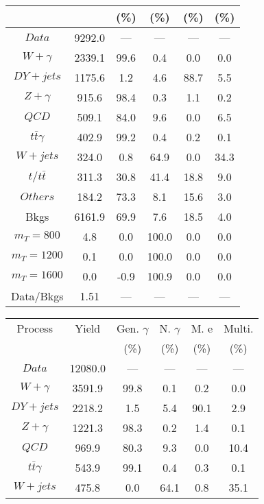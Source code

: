 \begin{figure}
\begin{minipage}[c]{0.32\textwidth}
{\begin{tabular}{cccccc}
 &  & (\%) & (\%) & (\%) & (\%)  \\
\hline
                                                                      $ Data $ &  9292.0 &  --- &  --- &  --- &  ---\\
$ W+\gamma $ &  2339.1 &  99.6 &  0.4 &  0.0 &  0.0\\
$ DY+jets $ &  1175.6 &  1.2 &  4.6 &  88.7 &  5.5\\
$ Z+\gamma $ &  915.6 &  98.4 &  0.3 &  1.1 &  0.2\\
$ QCD $ &  509.1 &  84.0 &  9.6 &  0.0 &  6.5\\
$ t\bar{t}\gamma $ &  402.9 &  99.2 &  0.4 &  0.2 &  0.1\\
$ W+jets $ &  324.0 &  0.8 &  64.9 &  0.0 &  34.3\\
$ t/t\bar{t} $ &  311.3 &  30.8 &  41.4 &  18.8 &  9.0\\
$ Others $ &  184.2 &  73.3 &  8.1 &  15.6 &  3.0\\
Bkgs &  6161.9 &  69.9 &  7.6 &  18.5 &  4.0\\
$ m_{T} = 800 $ &  4.8 &  0.0 &  100.0 &  0.0 &  0.0\\
$ m_{T} = 1200 $ &  0.1 &  0.0 &  100.0 &  0.0 &  0.0\\
$ m_{T} = 1600 $ &  0.0 &  -0.9 &  100.9 &  0.0 &  0.0\\
Data/Bkgs &  1.51 &  --- &  --- &  --- &  ---\\
\hline
\end{tabular}
}
\end{minipage}
\begin{minipage}[c]{0.32\textwidth}
\centering
\tiny{
\begin{tabular}{cccccc}
\hline
Process & Yield & Gen. $\gamma$ & N. $\gamma$ & M. e & Multi. \\
 &  & (\%) & (\%) & (\%) & (\%)  \\
\hline
                                                                      $ Data $ &  12080.0 &  --- &  --- &  --- &  ---\\
$ W+\gamma $ &  3591.9 &  99.8 &  0.1 &  0.2 &  0.0\\
$ DY+jets $ &  2218.2 &  1.5 &  5.4 &  90.1 &  2.9\\
$ Z+\gamma $ &  1221.3 &  98.3 &  0.2 &  1.4 &  0.1\\
$ QCD $ &  969.9 &  80.3 &  9.3 &  0.0 &  10.4\\
$ t\bar{t}\gamma $ &  543.9 &  99.1 &  0.4 &  0.3 &  0.1\\
$ W+jets $ &  475.8 &  0.0 &  64.1 &  0.8 &  35.1\\

\end{tabular}}
\end{minipage}
\end{figure}
